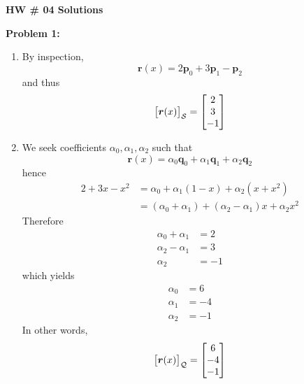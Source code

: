 \documentclass[letterpaper]{article}
\begin{document}
\newcommand{\trace}{\mathrm{trace}}
\newcommand{\real}{\mathbb R}  %
\newcommand{\nat}{\mathbb R}   %
\newcommand{\cp}{\mathbb C}    %
\newcommand{\ds}{\displaystyle}
\newcommand{\mf}[2]{\frac{\ds #1}{\ds #2}}
\newcommand{\book}[2]{{Luenberger, Page~#1, }{Prob.~#2}}
\newcommand{\spanof}[1]{\textrm{span} \{ #1 \}}
\parindent 0pt


\begin{center}
{\large \bf HW \# 04 Solutions}
\end{center}

\vspace*{1cm}


\noindent \textbf{Problem 1:}
\begin{enumerate}
\setlength{\itemsep}{.1in}
\renewcommand{\labelenumi}{(\alph{enumi})}
\item By inspection,
$$\boldsymbol{r}(x)=2\boldsymbol{p}_0 + 3\boldsymbol{p}_1 - \boldsymbol{p}_2$$
and thus
$$\big[\boldsymbol{r}(x)\big]_{\cal S} = \begin{bmatrix} 2 \\ 3 \\ -1 \end{bmatrix}$$

\item We seek coefficients $\alpha_0 , \alpha_1 , \alpha_2$ such that
$$\boldsymbol{r}(x)=\alpha_0 \boldsymbol{q}_0 + \alpha_1 \boldsymbol{q}_1 + \alpha_2 \boldsymbol{q}_2$$
hence
$$\begin{aligned}
    2+3x-x^2 &= \alpha_0 + \alpha_1 (1-x) + \alpha_2 (x+x^2) \\
             &= ( \alpha_0 + \alpha_1 ) + ( \alpha_2 - \alpha_1 ) x + \alpha_2 x^2
\end{aligned}$$
Therefore
$$\begin{aligned}
    \alpha_0 + \alpha_1 &= 2 \\
    \alpha_2 - \alpha_1 &= 3 \\
    \alpha_2 &= -1
\end{aligned}$$
which yields
$$\begin{aligned}
    \alpha_0 &= 6 \\
    \alpha_1 &= -4 \\
    \alpha_2 &= -1
\end{aligned}$$
In other words,
$$\big[\boldsymbol{r}(x)\big]_{\cal Q} = \begin{bmatrix} 6 \\ -4 \\ -1 \end{bmatrix}$$


\end{enumerate}
\end{document}
